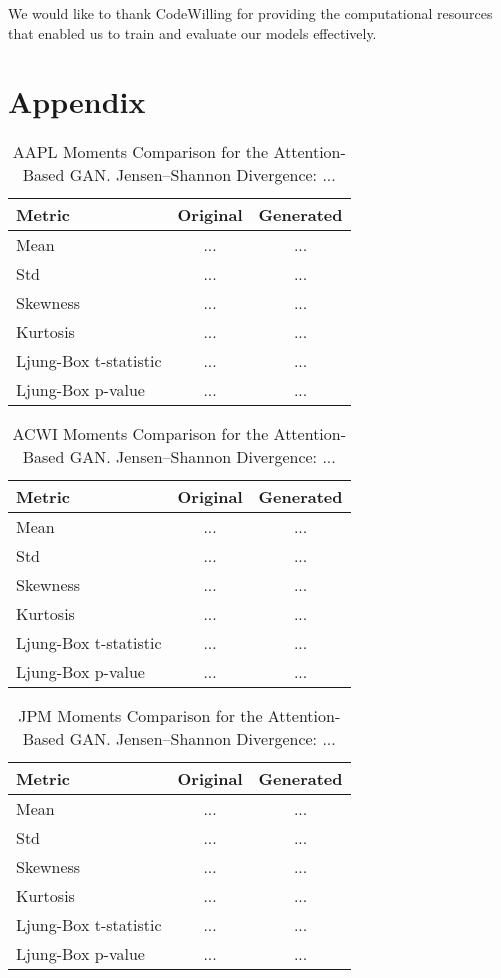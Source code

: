 \documentclass{article}
\begin{document}
We would like to thank CodeWilling for providing the computational resources that enabled us to train and evaluate our models effectively.

\printbibliography

\appendix
\section{Appendix}

\begin{table}[ht]
\centering
\begin{tabular}{lcc}
\hline
\textbf{Metric} & \textbf{Original} & \textbf{Generated} \\
\hline
Mean     & ... & ... \\
Std      & ... & ... \\
Skewness & ... & ... \\
Kurtosis & ... & ... \\
Ljung-Box t-statistic & ... & ... \\
Ljung-Box p-value & ... & ... \\
\hline
\end{tabular}
\caption{AAPL Moments Comparison for the Attention-Based GAN.
Jensen--Shannon Divergence: ...}
\label{tab:aapl_attention}
\end{table}

\begin{table}[ht]
\centering
\begin{tabular}{lcc}
\hline
\textbf{Metric} & \textbf{Original} & \textbf{Generated} \\
\hline
Mean     & ... & ... \\
Std      & ... & ... \\
Skewness & ... & ... \\
Kurtosis & ... & ... \\
Ljung-Box t-statistic & ... & ... \\
Ljung-Box p-value & ... & ... \\
\hline
\end{tabular}
\caption{ACWI Moments Comparison for the Attention-Based GAN.
Jensen--Shannon Divergence: ...}
\label{tab:acwi_attention}
\end{table}

\begin{table}[ht]
\centering
\begin{tabular}{lcc}
\hline
\textbf{Metric} & \textbf{Original} & \textbf{Generated} \\
\hline
Mean     & ... & ... \\
Std      & ... & ... \\
Skewness & ... & ... \\
Kurtosis & ... & ... \\
Ljung-Box t-statistic & ... & ... \\
Ljung-Box p-value & ... & ... \\
\hline
\end{tabular}
\caption{JPM Moments Comparison for the Attention-Based GAN.
Jensen--Shannon Divergence: ...}
\label{tab:jpm_attention}
\end{table}
\end{document}
